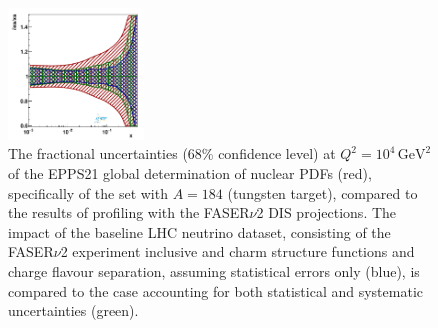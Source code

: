 \begin{figure}[t]
\includegraphics[width=0.32\textwidth]{plots/nuclear_fasernu2/inclusive+charm_chargediscrimination/fred05fcorr05_FASERv2_q2_10000_pdf_s_ratio.pdf}
\caption{The fractional uncertainties (68\% confidence level) at $Q^2 = 10^4 \, \textrm{GeV}^2$ of the EPPS21 global determination of nuclear PDFs (red),
specifically of the set with $A=184$ (tungsten target), 
compared to the results of profiling with the FASER$\nu$2 DIS projections.
The impact of the baseline LHC neutrino dataset, 
consisting of the FASER$\nu$2 experiment inclusive and charm structure functions and charge flavour separation,
assuming statistical errors only (blue), 
is compared to the case accounting for both statistical and systematic uncertainties (green).
}
\label{fig:profiling_syst_nuclear}
\end{figure}
